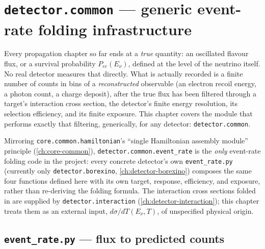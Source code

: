 \chapter{\texttt{detector.common} --- generic event-rate folding infrastructure}
\label{ch:detector-common}

Every propagation chapter so far ends at a \emph{true} quantity: an
oscillated flavour flux, or a survival probability $P_{ee}(E_\nu)$, defined
at the level of the neutrino itself. No real detector measures that
directly. What is actually recorded is a finite number of counts in bins of
a \emph{reconstructed} observable (an electron recoil energy, a photon
count, a charge deposit), after the true flux has been filtered through a
target's interaction cross section, the detector's finite energy
resolution, its selection efficiency, and its finite exposure. This chapter
covers the module that performs exactly that filtering, generically, for
any detector: \texttt{detector.common}.

Mirroring \texttt{core.common.hamiltonian}'s ``single Hamiltonian assembly
module'' principle (\cref{ch:core-common}), \texttt{detector.common.event\_rate}
is the \emph{only} event-rate folding code in the project: every concrete
detector's own \texttt{event\_rate.py} (currently only
\texttt{detector.borexino}, \cref{ch:detector-borexino}) composes the same
four functions defined here with its own target, response, efficiency, and
exposure, rather than re-deriving the folding formula. The interaction
cross sections folded in are supplied by \texttt{detector.interaction}
(\cref{ch:detector-interaction}); this chapter treats them as an external
input, $d\sigma/dT(E_\nu,T)$, of unspecified physical origin.

\section{\texttt{event\_rate.py} --- flux to predicted counts}
\label{sec:detector-event-rate}


